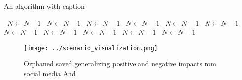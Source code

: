 \documentclass[a4paper]{article}
\begin{document}
\begin{algorithm}
\caption{An algorithm with caption}
\begin{algorithmic}
\    \State $N \gets N - 1$
\    \State $N \gets N - 1$
\    \State $N \gets N - 1$
\    \State $N \gets N - 1$
\    \State $N \gets N - 1$
\    \State $N \gets N - 1$
\    \State $N \gets N - 1$
\    \State $N \gets N - 1$
\    \State $N \gets N - 1$
\    \State $N \gets N - 1$
\    \State $N \gets N - 1$
\EndWhile
\end{algorithmic}
\end{algorithm}

\begin{figure}
\centering
\texttt{[image: ../scenario\_visualization.png]}
\caption{Orphaned saved generalizing positive and negative impacts rom social media And 
}
\end{figure}
 
\end{document}

